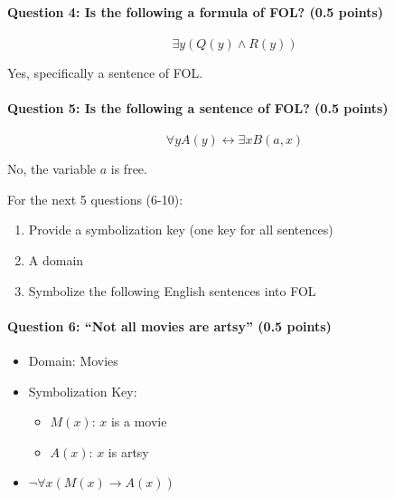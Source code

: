 \documentclass[letterpaper,11pt]{article}
\theoremstyle{mytheor}
\begin{document}
\paragraph{Question 4: Is the following a formula of FOL? (0.5 points)}
\begin{equation*}
    \exists y \left( Q(y) \land R(y) \right)
\end{equation*}
\begin{framed}
    Yes, specifically a sentence of FOL.
\end{framed}

\paragraph{Question 5: Is the following a sentence of FOL? (0.5 points)}
\begin{equation*}
    \forall y A(y) \leftrightarrow \exists x B(a,x)
\end{equation*}
\begin{framed}
    No, the variable $a$ is free.
\end{framed}

For the next 5 questions (6-10):
\begin{enumerate}
    \item Provide a symbolization key (one key for all sentences)
    \item A domain
    \item Symbolize the following English sentences into FOL
\end{enumerate}
\paragraph{Question 6: ``Not all movies are artsy'' (0.5 points)}
\phantom{a}
\begin{framed}
    \begin{itemize}
        \item Domain: Movies
        \item Symbolization Key:
        \begin{itemize}
            \item $M(x)$: $x$ is a movie
            \item $A(x)$: $x$ is artsy
        \end{itemize}
        \item $\neg \forall x \left(M(x) \rightarrow A(x)\right)$
    \end{itemize}
\end{framed}
\end{document}
